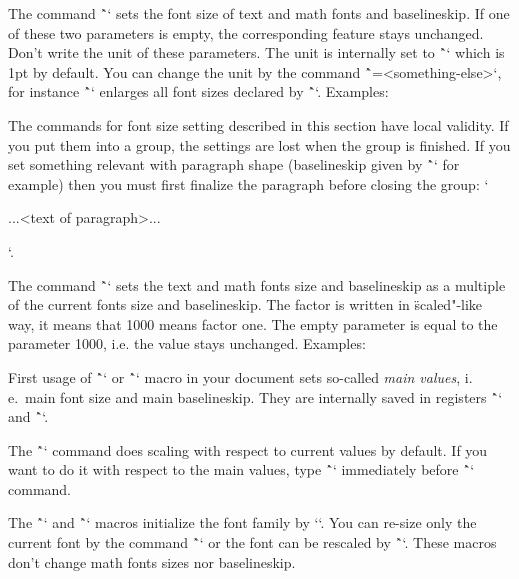 The command \^`` sets the font size of text and
math fonts and baselineskip. If one of these two parameters is empty, the
corresponding feature stays unchanged. Don't write the unit of these
parameters. The unit is internally set to \^`\ptunit` which is 1pt by default.
You can change the unit by the command \^`\ptunit=<something-else>`,
for instance \^`\ptunit=1mm` enlarges all font sizes declared by \^`\typosize`.
Examples:

\begtt
\typosize[10/12]   %
\typosize[11/12.5] %
\typosize[8/]      %
\endtt

The commands for font size setting described in this section
have local validity. If you put them into a group,
the settings are lost when the group is finished. If you set
something relevant with paragraph shape (baselineskip given by
\^`\typosize` for example) then you must first finalize the
paragraph before closing the group:
`{\typosize[12/14] ...<text of paragraph>... \par}`.

The command \^``
sets the text and math fonts
size and baselineskip as a multiple of the current fonts size and
baselineskip. The factor is written in \"scaled"-like way, it means that 1000
means factor one. The empty parameter is equal to the parameter 1000,
i.e. the value stays unchanged. Examples:

\begtt
\typoscale[800/800]    %
\typoscale[\magstep2/] %
\endtt

First usage of \^`\typosize` or \^`\typoscale` macro in your document sets so-called {\em main values}, i.\,e.\ main font size and main baselineskip. They are internally
saved in registers \^`\mainfosize` and \^`\mainbaselineskip`.

\new
The \^`\typoscale` command does scaling with respect to current values by default.
If you want to do it with respect to the main values, type \^`\scalemain` immediately
before \^`\typoscale` command.

\begtt
\typosize[12/14.4] %
\typosize[15/18]   %
\scalemain \typoscale[800/800] %
\endtt

The \^`\typosize` and \^`\typoscale` macros initialize the font family by `\rm`.
You can re-size only the current font by the command
\^`` or the font can be rescaled by
\^`\thefontscale[<factor>]`. These macros don't change math fonts sizes nor
baselineskip.

